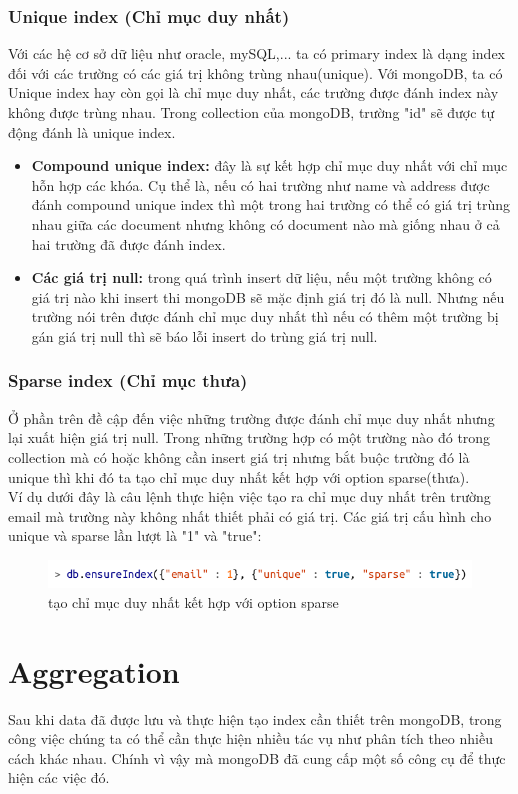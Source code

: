 \subsubsection{Unique index (Chỉ mục duy nhất)}
Với các hệ cơ sở dữ liệu như oracle, mySQL,... ta có primary index là dạng index đối với các trường có các giá trị không trùng nhau(unique). Với mongoDB, ta có Unique index hay còn gọi là chỉ mục duy nhất, các trường được đánh index này không được trùng nhau. Trong collection của mongoDB, trường "id" sẽ được tự động đánh là unique index.
\begin{itemize}
	\item \textbf{Compound unique index: }đây là sự kết hợp chỉ mục duy nhất với chỉ mục hỗn hợp các khóa. Cụ thể là, nếu có hai trường như name và address được đánh compound unique index thì một trong hai trường có thể có giá trị trùng nhau giữa các document nhưng không có document nào mà giống nhau ở cả hai trường đã được đánh index.
	\item \textbf{Các giá trị null: }trong quá trình insert dữ liệu, nếu một trường không có giá trị nào khi insert thi mongoDB sẽ mặc định giá trị đó là null. Nhưng nếu trường nói trên được đánh chỉ mục duy nhất thì nếu có thêm một trường bị gán giá trị null thì sẽ báo lỗi insert do trùng giá trị null.
\end{itemize}
\subsubsection{Sparse index (Chỉ mục thưa)}
Ở phần trên đề cập đến việc những trường được đánh chỉ mục duy nhất nhưng lại xuất hiện giá trị null. Trong những trường hợp có một trường nào đó trong collection mà có hoặc không cần insert giá trị nhưng bắt buộc trường đó là unique thì khi đó ta tạo chỉ mục duy nhất kết hợp với option sparse(thưa).\\
Ví dụ dưới đây là câu lệnh thực hiện việc tạo ra chỉ mục duy nhất trên trường email mà trường này không nhất thiết phải có giá trị. Các giá trị cấu hình cho unique và sparse lần lượt là "1" và "true":
\begin{figure}[h!]
		\centering
		\includegraphics[scale=0.5]{charts/sparse.png}
		\caption{tạo chỉ mục duy nhất kết hợp với option sparse}
		\label{fig:spindex}
\end{figure}

\section{Aggregation}\cite{def1}
Sau khi data đã được lưu và thực hiện tạo index cần thiết trên mongoDB, trong công việc chúng ta có thể cần thực hiện nhiều tác vụ như phân tích theo nhiều cách khác nhau. Chính vì vậy mà mongoDB đã cung cấp một số công cụ để thực hiện các việc đó.\\
